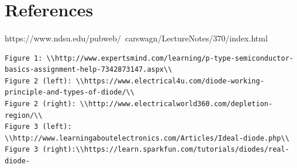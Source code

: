 \documentclass[a4paper]{article}
\begin{document}
\paragraph{}



\section{References}
\paragraph{}
https://www.ndsu.edu/pubweb/~carswagn/LectureNotes/370/index.html

\begin{lstlisting}
Figure 1: \\http://www.expertsmind.com/learning/p-type-semiconductor-basics-assignment-help-7342873147.aspx\\
Figure 2 (left): \\https://www.electrical4u.com/diode-working-principle-and-types-of-diode/\\
Figure 2 (right): \\http://www.electricalworld360.com/depletion-region/\\
Figure 3 (left): \\http://www.learningaboutelectronics.com/Articles/Ideal-diode.php\\
Figure 3 (right):\\https://learn.sparkfun.com/tutorials/diodes/real-diode-
\end{lstlisting}
\end{document}
